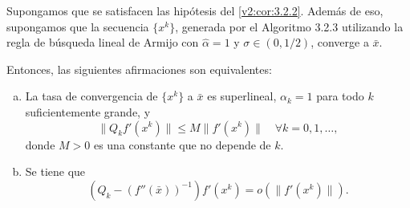 \begin{theorem}\label{v2:thm:3.2.2}
    Supongamos que se satisfacen las hipótesis del \cref{v2:cor:3.2.2}. Además de eso, supongamos que la secuencia $\{x^k\}$, generada por el Algoritmo 3.2.3 utilizando la regla de búsqueda lineal de Armijo con $\hat{\alpha} = 1$ y $\sigma \in (0, 1/2)$, converge a $\bar{x}$.
    
    Entonces, las siguientes afirmaciones son equivalentes:
    \begin{enumerate}[(a)]
        \item La tasa de convergencia de $\{x^k\}$ a $\bar{x}$ es superlineal, $\alpha_k = 1$ para todo $k$ suficientemente grande, y
        \begin{equation}
            \|Q_k f'(x^k)\| \le M \|f'(x^k)\| \quad \forall k=0, 1, \dots,
            \label{v2:eq:3.65}
        \end{equation}
        donde $M > 0$ es una constante que no depende de $k$.
        
        \item Se tiene que
        \begin{equation}
            (Q_k - (f''(\bar{x}))^{-1})f'(x^k) = o(\|f'(x^k)\|).
            \label{v2:eq:3.66}
        \end{equation}
    \end{enumerate}
\end{theorem}

